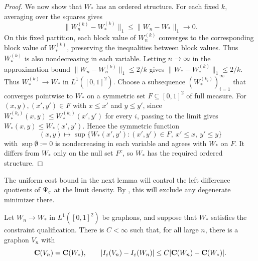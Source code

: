 \begin{proof}
We now show that $W_*$ has an ordered structure.
For each fixed $k$, averaging over the squares gives
\[
  \|W_n^{(k)}-W_*^{(k)}\|_1\le\|W_n-W_*\|_1\longrightarrow0.
\]
On this fixed partition, each block value of $W_n^{(k)}$
converges to the corresponding block value
of $W_*^{(k)}$, preserving the inequalities between block values.
Thus $W_*^{(k)}$ is also nondecreasing in each variable.
Letting $n\to\infty$ in the approximation bound $\|W_n-W_n^{(k)}\|_1\le2/k$
gives $\|W_*-W_*^{(k)}\|_1\le2/k$.
Thus $W_*^{(k)}\to W_*$ in $L^1([0,1]^2)$. Choose a subsequence
$(W_*^{(k_i)})_{i=1}^{\infty}$ that converges pointwise to $W_*$ on a
symmetric set $F\subseteq[0,1]^2$ of full measure.
For $(x,y),(x',y')\in F$ with $x\le x'$ and $y\le y'$,
since $W_*^{(k_i)}(x,y)\le W_*^{(k_i)}(x',y')$ for every $i$,
passing to the limit gives $W_*(x,y)\le W_*(x',y')$.
Hence the symmetric function
\[
  (x,y)\longmapsto
  \sup\bigl\{W_*(x',y'):(x',y')\in F,\ x'\le x,\ y'\le y\bigr\}
\]
with $\sup\emptyset:=0$ is nondecreasing in each variable and agrees with
$W_*$ on $F$. It differs from $W_*$ only on the null set $F^c$, so
$W_*$ has the required ordered structure.
\end{proof}

The uniform cost bound in the next lemma will control the left
difference quotients of $\Psi_\varepsilon$ at the limit density. By
, this will exclude any degenerate minimizer there.

\begin{lemma}\label{lem:uniform-density-restoration}
Let $W_n\to W_*$ in $L^1([0,1]^2)$ be graphons, and suppose that $W_*$ satisfies the
constraint qualification.  There is $C<\infty$ such that, for all large $n$,
there is a graphon $V_n$ with
\[
  \mathbf C(V_n)=\mathbf C(W_*),\qquad
  |I_\varepsilon(V_n)-I_\varepsilon(W_n)|\le C|\mathbf C(W_n)-\mathbf C(W_*)|.
\]
\end{lemma}


